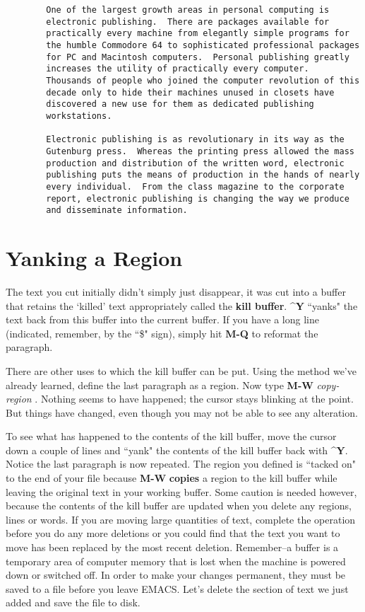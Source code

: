 \begin{verbatim}
        One of the largest growth areas in personal computing is
        electronic publishing.  There are packages available for
        practically every machine from elegantly simple programs for
        the humble Commodore 64 to sophisticated professional packages
        for PC and Macintosh computers.  Personal publishing greatly
        increases the utility of practically every computer.
        Thousands of people who joined the computer revolution of this
        decade only to hide their machines unused in closets have
        discovered a new use for them as dedicated publishing
        workstations.

        Electronic publishing is as revolutionary in its way as the
        Gutenburg press.  Whereas the printing press allowed the mass
        production and distribution of the written word, electronic
        publishing puts the means of production in the hands of nearly
        every individual.  From the class magazine to the corporate
        report, electronic publishing is changing the way we produce
        and disseminate information.
\end{verbatim}

\section{Yanking a Region}

The text you cut initially didn't simply just disappear, it was cut
into a buffer that retains the `killed' text appropriately called the
{\bf{}kill buffer}.  {\bf{}\^{}Y} ``yanks" the text back from this
buffer into the current buffer. If you have a long line (indicated,
remember, by the ``\$" sign), simply hit {\bf{}M-Q} to reformat the
paragraph.

There are other uses to which the kill buffer can be put.  Using the
 method we've already learned, define the last
paragraph as a region.  Now type {\bf{}M-W} {\it{}copy-region}
.  Nothing seems to have happened; the cursor stays
blinking at the point.  But things have changed, even though you may not
be able to see any alteration.

To see what has happened to the contents of the kill buffer, move the
cursor down a couple of lines and ``yank" the contents of the kill buffer
back with {\bf{}\^{}Y}.  Notice the last paragraph is now repeated.  The
region you defined is ``tacked on" to the end of your file because
{\bf{}M-W} {\bf{}copies} a region to the kill buffer while leaving the
original text in your working buffer.  Some caution is needed however,
because the contents of the kill buffer are updated when you delete any
regions, lines or words.  If you are moving large quantities of text,
complete the operation before you do any more deletions or you could
find that the text you want to move has been replaced by the most recent
deletion.  Remember--a buffer is a temporary area of computer memory
that is lost when the machine is powered down or switched off.  In order
to make your changes permanent, they must be saved to a file before you
leave EMACS.  Let's delete the section of text we just added and save
the file to disk.

